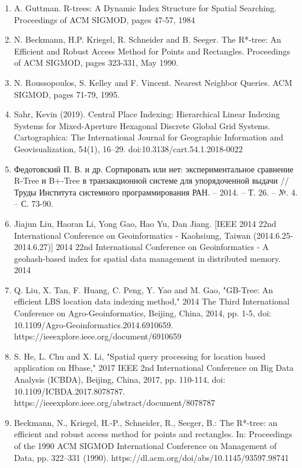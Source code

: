 %




\begin{enumerate}[1)]
    \item A. Guttman. R-trees: A Dynamic Index Structure for Spatial Searching. Proceedings of ACM SIGMOD, pages 47-57, 1984
    \item N. Beckmann, H.P. Kriegel, R. Schneider and B. Seeger. The R*-tree: An Efficient and Robust Access Method for Points and Rectangles. Proceedings of ACM SIGMOD, pages 323-331, May 1990.
    \item N. Roussopoulos, S. Kelley and F. Vincent. Nearest Neighbor Queries. ACM SIGMOD, pages 71-79, 1995.
    \item Sahr, Kevin (2019). Central Place Indexing: Hierarchical Linear Indexing Systems for Mixed-Aperture Hexagonal Discrete Global Grid Systems. Cartographica: The International Journal for Geographic Information and Geovisualization, 54(1), 16–29. doi:10.3138/cart.54.1.2018-0022
    \item Федотовский П. В. и др. Сортировать или нет: экспериментальное сравнение R-Tree и B+-Tree в транзакционной системе для упорядоченной выдачи //Труды Института системного программирования РАН. – 2014. – Т. 26. – №. 4. – С. 73-90.
    \item  Jiajun Liu, Haoran Li, Yong Gao, Hao Yu, Dan Jiang. [IEEE 2014 22nd International Conference on Geoinformatics - Kaohsiung, Taiwan (2014.6.25-2014.6.27)] 2014 22nd International Conference on Geoinformatics - A geohash-based index for spatial data management in distributed memory. 2014
    \item Q. Liu, X. Tan, F. Huang, C. Peng, Y. Yao and M. Gao, "GB-Tree: An efficient LBS location data indexing method," 2014 The Third International Conference on Agro-Geoinformatics, Beijing, China, 2014, pp. 1-5, doi: 10.1109/Agro-Geoinformatics.2014.6910659. https://ieeexplore.ieee.org/document/6910659
    \item S. He, L. Chu and X. Li, "Spatial query processing for location based application on Hbase," 2017 IEEE 2nd International Conference on Big Data Analysis (ICBDA), Beijing, China, 2017, pp. 110-114, doi: 10.1109/ICBDA.2017.8078787. https://ieeexplore.ieee.org/abstract/document/8078787
    \item  Beckmann, N., Kriegel, H.-P., Schneider, R., Seeger, B.: The R*-tree: an efficient and robust access method for points and rectangles. In: Proceedings of the 1990 ACM SIGMOD International Conference on Management of Data, pp. 322–331 (1990). https://dl.acm.org/doi/abs/10.1145/93597.98741

\end{enumerate}
